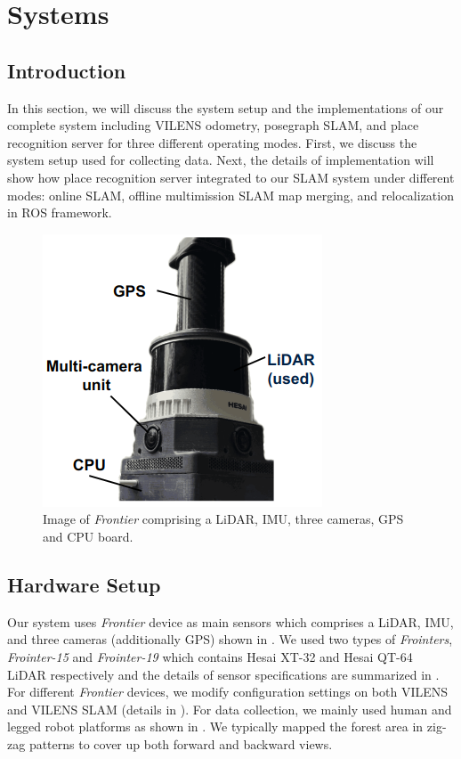 \chapter{Systems}
\label{ch:system}
\section{Introduction}
In this section, we will discuss the system setup and the implementations of our complete system including VILENS odometry, posegraph SLAM, and place recognition server for three different operating modes. First, we discuss the system setup used for collecting data. Next, the details of implementation will show how place recognition server integrated to our SLAM system under different modes: online SLAM, offline multimission SLAM map merging, and relocalization in ROS framework.

\begin{figure}[t]
  \centering
  \includegraphics[width=0.4\columnwidth]{pics/setup_Frontier_pic2.png}
  \caption{Image of \emph{Frontier} comprising a LiDAR, IMU, three cameras, GPS and CPU board. }
  \label{fig:frontier}
\end{figure}

\section{Hardware Setup}
\label{sec:system_setup}
Our system uses \emph{Frontier} device as main sensors which comprises a LiDAR, IMU, and three cameras (additionally GPS) shown in . We used two types of \emph{Frointers}, \emph{Frointer-15} and \emph{Frointer-19} which contains Hesai XT-32 and Hesai QT-64 LiDAR respectively and the details of sensor specifications are summarized in . For different \emph{Frontier} devices, we modify configuration settings on both VILENS and VILENS SLAM (details in \cite{wisth2023tro,proudman2022ras}). For data collection, we mainly used human and legged robot platforms as shown in . We typically mapped the forest area in zig-zag patterns to cover up both forward and backward views. 




